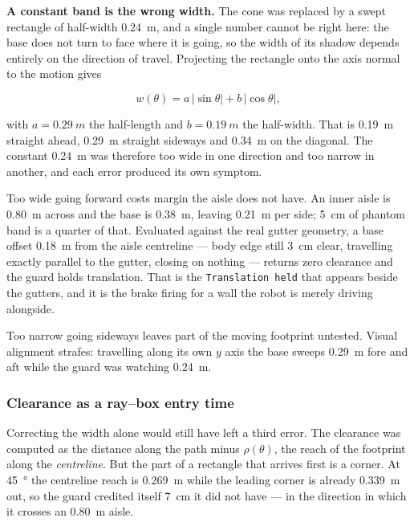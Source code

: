 \textbf{A constant band is the wrong width.} The cone was replaced by a
swept rectangle of half-width \SI{0.24}{m}, and a single number cannot be
right here: the base does not turn to face where it is going, so the width of
its shadow depends entirely on the direction of travel. Projecting the
rectangle onto the axis normal to the motion gives

\begin{equation}
w(\theta) = a\,|\sin\theta| + b\,|\cos\theta|,
\label{eq:sweptband}
\end{equation}

with $a = \SI{0.29}{m}$ the half-length and $b = \SI{0.19}{m}$ the
half-width. That is \SI{0.19}{m} straight ahead, \SI{0.29}{m} straight
sideways and \SI{0.34}{m} on the diagonal. The constant \SI{0.24}{m} was
therefore too wide in one direction and too narrow in another, and each error
produced its own symptom.

Too wide going forward costs margin the aisle does not have. An inner aisle
is \SI{0.80}{m} across and the base is \SI{0.38}{m}, leaving \SI{0.21}{m}
per side; \SI{5}{cm} of phantom band is a quarter of that. Evaluated against
the real gutter geometry, a base offset \SI{0.18}{m} from the aisle
centreline --- body edge still \SI{3}{cm} clear, travelling exactly parallel
to the gutter, closing on nothing --- returns zero clearance and the guard
holds translation. That is the \texttt{Translation held} that appears beside
the gutters, and it is the brake firing for a wall the robot is merely
driving alongside.

Too narrow going sideways leaves part of the moving footprint untested.
Visual alignment strafes: travelling along its own $y$ axis the base sweeps
\SI{0.29}{m} fore and aft while the guard was watching \SI{0.24}{m}.

\subsubsection{Clearance as a ray--box entry time}

Correcting the width alone would still have left a third error. The
clearance was computed as the distance along the path minus
$\rho(\theta)$, the reach of the footprint along the \emph{centreline}. But
the part of a rectangle that arrives first is a corner. At
\SI{45}{\degree} the centreline reach is \SI{0.269}{m} while the leading
corner is already \SI{0.339}{m} out, so the guard credited itself
\SI{7}{cm} it did not have --- in the direction in which it crosses an
\SI{0.80}{m} aisle.

